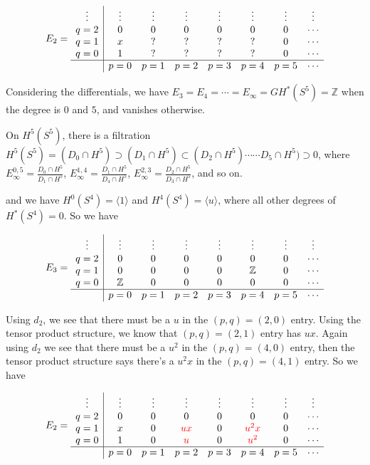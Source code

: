 \documentclass{article}
\theoremstyle{mystyle}
\theoremstyle{remark}
\numberwithin{equation}{section}
\begin{document}
$$
E_2 = \begin{array}{c|ccccccc}
\vdots & \vdots & \vdots & \vdots & \vdots & \vdots & \vdots & \vdots\\
q=2 & 0 & 0 & 0 & 0 & 0 & 0 &  \cdots\\
q=1 & x & ? & ? & ? & ? & 0 & \cdots \\
q=0 & 1 & ? & ? & ? & ? & 0& \cdots \\
\hline
& p=0 & p=1 & p=2 & p=3 & p=4 & p=5 & \cdots 
\end{array}
$$








Considering the differentials, we have $E_3 = E_4=\cdots = E_\infty = GH^*(S^5) = \mathbb{Z}$ when the degree is $0$ and $5$, and vanishes otherwise.




On $H^5(S^5)$, there is a filtration $H^5(S^5)  = (D_0 \cap H^5) \supset (D_1\cap H^5) \subset (D_2\cap H^5)\cdots \cdots D_5 \cap H^5)\supset 0$, where $E^{0,5}_\infty = \frac{D_0\cap H^5}{D_1\cap H^5}$, $E^{1,4}_\infty = \frac{D_1\cap H^5}{D_4\cap H^5}$, 
$E^{2,3}_\infty = \frac{D_2\cap H^5}{D_3\cap H^5}$, and so on. 





and we have $H^0(S^4) = \langle 1\rangle$ and $H^4(S^4)=\langle u\rangle$, where all other degrees of $H^*(S^4)=0$. So we have

$$
E_3 = \begin{array}{c|ccccccc}
\vdots & \vdots & \vdots & \vdots & \vdots & \vdots & \vdots & \vdots\\
q=2 & 0 & 0 & 0 & 0 & 0 & 0 &  \cdots\\
q=1 & 0 & 0 & 0 & 0 & \mathbb{Z} & 0 & \cdots \\
q=0 & \mathbb{Z} & 0 & 0 & 0 & 0 & 0& \cdots \\
\hline
& p=0 & p=1 & p=2 & p=3 & p=4 & p=5 & \cdots 
\end{array}
$$

Using $d_2$, we see that there must be a $u$ in the $(p,q) = (2,0)$ entry. Using the tensor product structure, we know that $(p,q)=(2,1)$ entry has $ux$. Again using $d_2$ we see that there must be a $u^2$ in the $(p,q) =(4,0)$ entry, then the tensor product structure says there's a $u^2 x$ in the $(p,q)=(4,1)$ entry. So we have


$$
E_2 = \begin{array}{c|ccccccc}
\vdots & \vdots & \vdots & \vdots & \vdots & \vdots & \vdots & \vdots\\
q=2 & 0 & 0 & 0 & 0 & 0 & 0 &  \cdots\\
q=1 & x & 0 & \color{red}{ux} & 0 & \color{red}{u^2x} & 0 & \cdots \\
q=0 & 1 & 0 & \color{red}{u} & 0 & \color{red}{u^2} & 0& \cdots \\
\hline
& p=0 & p=1 & p=2 & p=3 & p=4 & p=5 & \cdots 
\end{array}
$$
\end{document}
